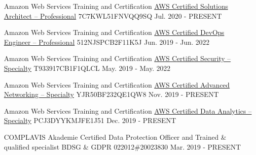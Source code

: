 

\begin{cventries}

  \cventry
    {Amazon Web Services Training and Certification}
    {\href{https://www.youracclaim.com/badges/e00de02f-620b-41b5-8ad7-3caaa7993bc9}{AWS Certified Solutions Architect – Professional}}
    {7C7KWL51FNVQQ9SQ}
    {Jul. 2020 - PRESENT}
    {}

\cventry
    {Amazon Web Services Training and Certification}
    {\href{https://www.youracclaim.com/badges/47430bb9-b9ea-4927-97af-c79b3a9c6d04}{AWS Certified DevOps Engineer – Professional}}
    {512NJSPCB2F11K5J}
    {Jun. 2019 - Jun. 2022}
    {}

\cventry
    {Amazon Web Services Training and Certification}
    {\href{https://www.youracclaim.com/badges/2cd78cd7-189d-41cd-ac59-535b65cef3f9}{AWS Certified Security – Specialty}}
    {T933917CB1F1QLCL}
    {May. 2019 - May. 2022}
    {}

\cventry
    {Amazon Web Services Training and Certification}
    {\href{https://www.youracclaim.com/badges/1eada9e9-bdeb-4bcc-b056-5519c722a312}{AWS Certified Advanced Networking – Specialty}}
    {YJR50BF232QE1QW8}
    {Nov. 2019 - PRESENT}
    {}

\cventry
    {Amazon Web Services Training and Certification}
    {\href{https://www.youracclaim.com/badges/ea88e1a0-800e-4d98-b116-a9614a40966c}{AWS Certified Data Analytics – Specialty}}
    {PCJ3DYYKMJFE1J51}
    {Dec. 2019 - PRESENT}
    {}

\cventry
    {COMPLAVIS Akademie}
    {Certified Data Protection Officer and Trained \& qualified specialist BDSG \& GDPR}
    {022012\#20023830}
    {Mar. 2019 - PRESENT}
    {}

\end{cventries}
